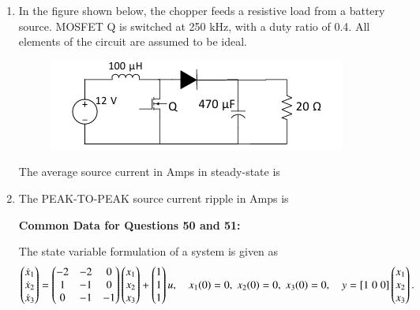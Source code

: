 \documentclass[journal,12pt,onecolumn]{IEEEtran}
\theoremstyle{remark}
\begin{document}
\begin{enumerate}
\item In the figure shown below, the chopper feeds a resistive load from a battery source. MOSFET Q is switched at 250 kHz, with a duty ratio of 0.4. All elements of the circuit are assumed to be ideal. 
\begin{figure}[H]
    \centering
    \includegraphics[width=0.5\columnwidth]{figs/22.png}
    \label{fig:placeholder}
\end{figure}
The average source current in Amps in steady-state is

\begin{enumerate}
\end{enumerate}


\item The PEAK-TO-PEAK source current ripple in Amps is

\begin{enumerate}
\end{enumerate}



\textbf{Common Data for Questions 50 and 51:}

The state variable formulation of a system is given as
\[
\begin{pmatrix} 
\dot{x}_1 \\ 
\dot{x}_2 \\ 
\dot{x}_3 
\end{pmatrix}
=
\begin{pmatrix} 
-2 & -2 & 0 \\ 
1 & -1 & 0 \\ 
0 & -1 & -1 
\end{pmatrix}
\begin{pmatrix} 
x_1 \\ 
x_2 \\ 
x_3 
\end{pmatrix}
+
\begin{pmatrix} 
1 \\ 
1 \\ 
1 
\end{pmatrix}u, 
\quad 
x_1(0)=0, \; x_2(0)=0, \; x_3(0)=0,
\quad
y = [1\;0\;0]
\begin{pmatrix} 
x_1 \\ x_2 \\ x_3
\end{pmatrix}.
\]



\end{enumerate}
\end{document}
